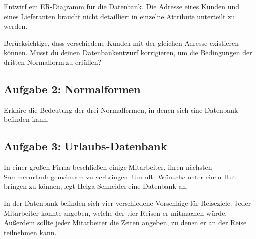 \begin{compactenum}[a)]
\item Entwirf ein ER-Diagramm für die Datenbank. Die Adresse eines Kunden und
eines Lieferanten braucht nicht detailliert in einzelne Attribute unterteilt
zu werden.
\item Berücksichtige, dass verschiedene Kunden mit der gleichen Adresse
existieren können. Musst du deinen Datenbankentwurf korrigieren, um die
Bedingungen der dritten Normalform zu erfüllen?
\end{compactenum}


\subsection{Aufgabe 2: Normalformen}

Erkläre die Bedeutung der drei Normalformen, in denen sich eine Datenbank
befinden kann.


\subsection{Aufgabe 3: Urlaubs-Datenbank}

In einer großen Firma beschließen einige Mitarbeiter, ihren nächsten
Sommerurlaub gemeinsam zu verbringen. Um alle Wünsche unter einen Hut bringen zu
können, legt Helga Schneider eine Datenbank an.

In der Datenbank befinden sich vier verschiedene Vorschläge für Reiseziele.
Jeder Mitarbeiter konnte angeben, welche der vier Reisen er mitmachen würde.
Außerdem sollte jeder Mitarbeiter die Zeiten angeben, zu denen er an der Reise
teilnehmen kann.

